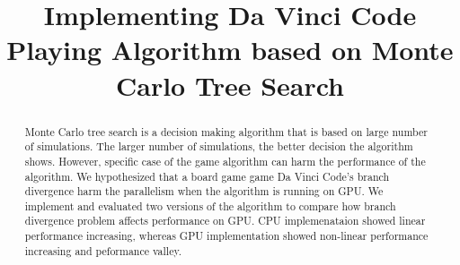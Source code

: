 \documentclass[conference]{IEEEtran}
\begin{document}
\title{Implementing Da Vinci Code Playing Algorithm based on Monte Carlo Tree Search}

\author{
\and
{}
\and
{}
}

\maketitle


\begin{abstract}
Monte Carlo tree search is a decision making algorithm that is based on large number of simulations.
The larger number of simulations, the better decision the algorithm shows.
However, specific case of the game algorithm can harm the performance of the algorithm.
We hypothesized that a board game game Da Vinci Code's branch divergence harm the parallelism when the algorithm is running on GPU.
We implement and evaluated two versions of the algorithm to compare how branch divergence problem affects performance on GPU.
CPU implemenataion showed linear performance increasing, whereas GPU implementation showed non-linear performance increasing and peformance valley.

\end{abstract}




\IEEEpeerreviewmaketitle














\end{document}

